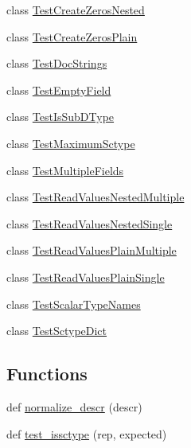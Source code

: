 \begin{DoxyCompactItemize}
\item 
class \hyperlink{classnumpy_1_1core_1_1tests_1_1test__numerictypes_1_1TestCreateZerosNested}{Test\+Create\+Zeros\+Nested}
\item 
class \hyperlink{classnumpy_1_1core_1_1tests_1_1test__numerictypes_1_1TestCreateZerosPlain}{Test\+Create\+Zeros\+Plain}
\item 
class \hyperlink{classnumpy_1_1core_1_1tests_1_1test__numerictypes_1_1TestDocStrings}{Test\+Doc\+Strings}
\item 
class \hyperlink{classnumpy_1_1core_1_1tests_1_1test__numerictypes_1_1TestEmptyField}{Test\+Empty\+Field}
\item 
class \hyperlink{classnumpy_1_1core_1_1tests_1_1test__numerictypes_1_1TestIsSubDType}{Test\+Is\+Sub\+D\+Type}
\item 
class \hyperlink{classnumpy_1_1core_1_1tests_1_1test__numerictypes_1_1TestMaximumSctype}{Test\+Maximum\+Sctype}
\item 
class \hyperlink{classnumpy_1_1core_1_1tests_1_1test__numerictypes_1_1TestMultipleFields}{Test\+Multiple\+Fields}
\item 
class \hyperlink{classnumpy_1_1core_1_1tests_1_1test__numerictypes_1_1TestReadValuesNestedMultiple}{Test\+Read\+Values\+Nested\+Multiple}
\item 
class \hyperlink{classnumpy_1_1core_1_1tests_1_1test__numerictypes_1_1TestReadValuesNestedSingle}{Test\+Read\+Values\+Nested\+Single}
\item 
class \hyperlink{classnumpy_1_1core_1_1tests_1_1test__numerictypes_1_1TestReadValuesPlainMultiple}{Test\+Read\+Values\+Plain\+Multiple}
\item 
class \hyperlink{classnumpy_1_1core_1_1tests_1_1test__numerictypes_1_1TestReadValuesPlainSingle}{Test\+Read\+Values\+Plain\+Single}
\item 
class \hyperlink{classnumpy_1_1core_1_1tests_1_1test__numerictypes_1_1TestScalarTypeNames}{Test\+Scalar\+Type\+Names}
\item 
class \hyperlink{classnumpy_1_1core_1_1tests_1_1test__numerictypes_1_1TestSctypeDict}{Test\+Sctype\+Dict}
\end{DoxyCompactItemize}
\subsection*{Functions}
\begin{DoxyCompactItemize}
\item 
def \hyperlink{namespacenumpy_1_1core_1_1tests_1_1test__numerictypes_a0ec90a5a3a0afba8bed519e708093de8}{normalize\+\_\+descr} (descr)
\item 
def \hyperlink{namespacenumpy_1_1core_1_1tests_1_1test__numerictypes_a2191a1a529be24ee047ddddcd3b1bb03}{test\+\_\+issctype} (rep, expected)
\end{DoxyCompactItemize}
